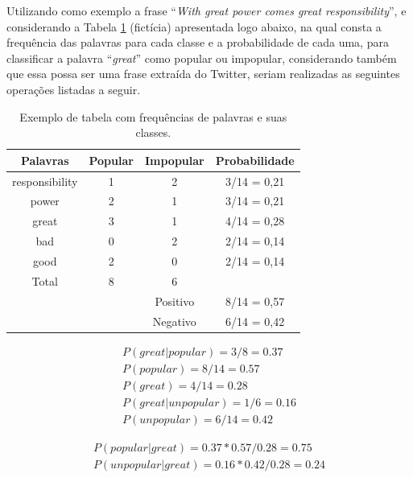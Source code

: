 \documentclass[oneside,openright,12pt]{ufsm_2015} %
\begin{document}
    \par Utilizando como exemplo a frase ``\textit{With great power comes great responsibility}'', e considerando a Tabela \ref{tab:naive-freq} (fictícia) apresentada logo abaixo, na qual consta a frequência das palavras para cada classe e a probabilidade de cada uma, para classificar a palavra ``\textit{great}'' como popular ou impopular, considerando também que essa possa ser uma frase extraída do Twitter, seriam realizadas as seguintes operações listadas a seguir.
    
    \begin{table}[ht]
        \caption{Exemplo de tabela com frequências de palavras e suas classes.}
        \centering
        \begin{tabular}{ c c c c }
            \hline
            Palavras & Popular & Impopular & Probabilidade \\
            \hline
            responsibility & 1 & 2 & 3/14 = 0,21 \\
            power & 2 & 1 & 3/14 = 0,21 \\
            great & 3 & 1 & 4/14 = 0,28 \\
            bad & 0 & 2 & 2/14 = 0,14 \\
            good & 2 & 0 & 2/14 = 0,14 \\
            \hline
            Total & 8 & 6 & \\
            \hline
            & & Positivo & 8/14 = 0,57 \\
            & & Negativo & 6/14 = 0,42 \\
            \hline
        \end{tabular}
        \vspace{\baselineskip} %
        \label{tab:naive-freq}
    \end{table}
    
    \begin{align}
    P(great|popular) = 3/8 = 0.37 \\
    P(popular) = 8/14 = 0.57 \\
    P(great) = 4/14 = 0.28 \\
    P(great|unpopular) = 1/6 = 0.16 \\
    P(unpopular) = 6/14 = 0.42
    \end{align}
    
    \begin{align}
    P(popular|great) = 0.37 * 0.57 / 0.28 = 0.75 \\
    P(unpopular|great) = 0.16 * 0.42 / 0.28 = 0.24
    \end{align}
    
\end{document}
